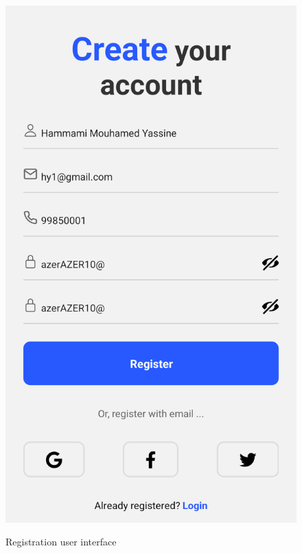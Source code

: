 \begin{figure}[H]
\begin{minipage}{0.45\textwidth}
    \centering
    \includegraphics[width=\linewidth]{images/chap2/RegisterFormFilled.png}
    \label{fig:login-form-filled}
\end{minipage}
    \caption{Registration user interface}
\end{figure}
\newpage
